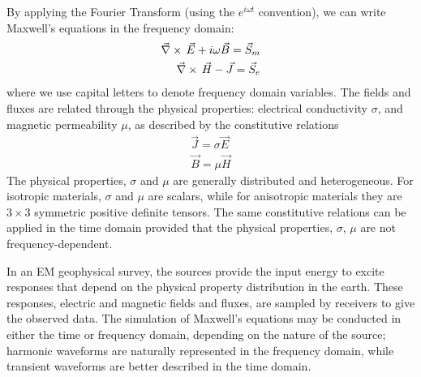 By applying the Fourier Transform (using the $e^{i\omega t}$ convention), we can write Maxwell's equations in the frequency domain:
\begin{equation}
\begin{split}
{\vec \nabla}\times\, \vec{E} + i\omega\vec{B} = \vec{S}_m \\
{\vec \nabla}\times\, \vec{H} - \vec{J} = \vec{S}_e
\end{split}
\label{eq:MaxwellBasicFreq}
\end{equation}
where we use capital letters to denote frequency domain variables. The fields and fluxes are  related through the physical properties: electrical conductivity $\sigma$, and magnetic permeability $\mu$, as described by the constitutive relations
\begin{equation}
\begin{split}
\vec{J} = \sigma \vec{E} \\
\vec{B} = \mu \vec{H}
\end{split}
\label{eq:ConstitutiveRelationsApp}
\end{equation}
The physical properties, $\sigma$ and $\mu$ are generally distributed and heterogeneous. For isotropic materials, $\sigma$ and $\mu$ are scalars, while for anisotropic materials they are $3\times3$ symmetric positive definite tensors. The same constitutive relations can be applied in the time domain provided that the physical properties, $\sigma$, $\mu$ are not frequency-dependent.

In an EM geophysical survey, the sources provide the input energy to excite responses that depend on the physical property distribution in the earth. These responses, electric and magnetic fields and fluxes, are sampled by receivers to give the observed data. The simulation of Maxwell's equations may be conducted in either the time or frequency domain, depending on the nature of the source; harmonic waveforms are naturally  represented in the frequency domain, while transient waveforms are better described in the time domain.

